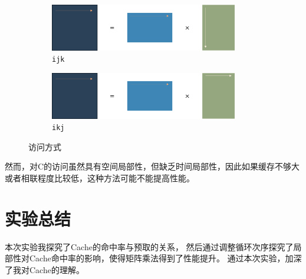 \documentclass[a4paper,twoside]{article}
\begin{document}
\begin{spacing}{1.2}
\begin{figure}[htb]
	\centering
	\begin{subfigure}{0.4\textwidth}
		\centering
		\caption{\texttt{ijk}}
		\label{fig:ijkacc}
		\includegraphics[width=0.9\textwidth]{acc.png}
	\end{subfigure}
	\begin{subfigure}{0.4\textwidth}
		\centering
		\caption{\texttt{ikj}}
		\label{fig:ikjacc}
		\includegraphics[width=0.9\textwidth]{acc2.png}
	\end{subfigure}
	\caption{访问方式}
	\label{fig:acc}
\end{figure}

然而，对C的访问虽然具有空间局部性，但缺乏时间局部性，因此如果缓存不够大或者相联程度比较低，这种方法可能不能提高性能。

\section{实验总结}

本次实验我探究了Cache的命中率与预取的关系，
然后通过调整循环次序探究了局部性对Cache命中率的影响，使得矩阵乘法得到了性能提升。
通过本次实验，加深了我对Cache的理解。

\end{spacing}
\end{document}
